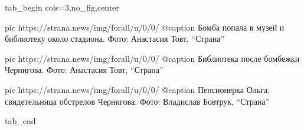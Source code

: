  
 
 
 
 


\ifcmt
  tab_begin cols=3,no_fig,center

     pic https://strana.news/img/forall/u/0/0/%
		 @caption Бомба попала в музей и библиотеку около стадиона. Фото: Анастасия Товт, \enquote{Страна}

		 pic https://strana.news/img/forall/u/0/0/%
		 @caption Библиотека после бомбежки Чернигова. Фото: Анастасия Товт, \enquote{Страна}

		 pic https://strana.news/img/forall/u/0/0/%
		 @caption Пенсионерка Ольга, свидетельница обстрелов Чернигова. Фото: Владислав Бовтрук, \enquote{Страна}

  tab_end
\fi

